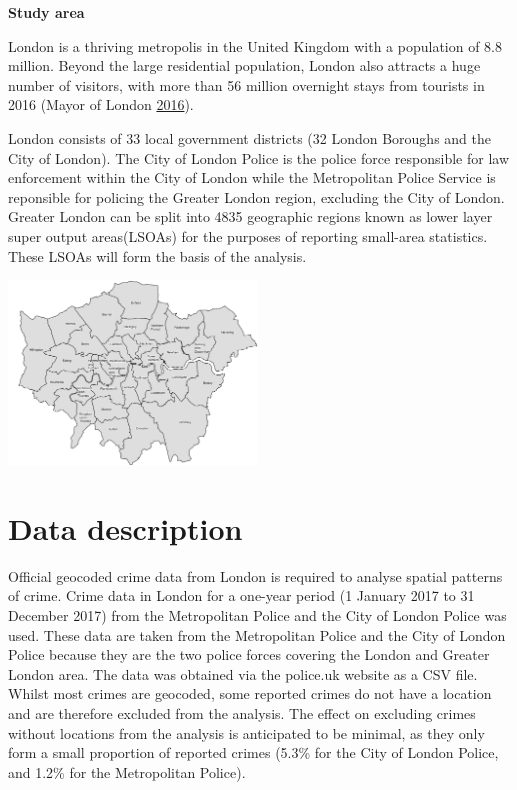 \documentclass[]{article}
\begin{document}
\textbf{Study area}

London is a thriving metropolis in the United Kingdom with a population
of 8.8 million. Beyond the large residential population, London also
attracts a huge number of visitors, with more than 56 million overnight
stays from tourists in 2016 (Mayor of London
\protect\hyperlink{ref-MayorofLondon2016}{2016}).

London consists of 33 local government districts (32 London Boroughs and
the City of London). The City of London Police is the police force
responsible for law enforcement within the City of London while the
Metropolitan Police Service is reponsible for policing the Greater
London region, excluding the City of London. Greater London can be split
into 4835 geographic regions known as lower layer super output
areas(LSOAs) for the purposes of reporting small-area statistics. These
LSOAs will form the basis of the analysis.

\includegraphics[width=2.60417in]{pictures/London.png} \pagebreak

\section{Data description}\label{data-description}

Official geocoded crime data from London is required to analyse spatial
patterns of crime. Crime data in London for a one-year period (1 January
2017 to 31 December 2017) from the Metropolitan Police and the City of
London Police was used. These data are taken from the Metropolitan
Police and the City of London Police because they are the two police
forces covering the London and Greater London area. The data was
obtained via the police.uk website as a CSV file. Whilst most crimes are
geocoded, some reported crimes do not have a location and are therefore
excluded from the analysis. The effect on excluding crimes without
locations from the analysis is anticipated to be minimal, as they only
form a small proportion of reported crimes (5.3\% for the City of London
Police, and 1.2\% for the Metropolitan Police).
\end{document}
